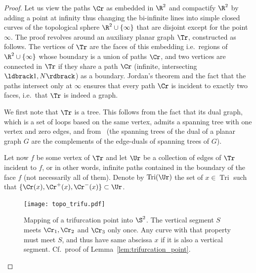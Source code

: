 \documentclass[12pt]{amsart}
\DeclareMathOperator{\Tri}{Tri}
\theoremstyle{remark}
\newcommand{\Li}{\ldbrack} %
\newcommand{\Ri}{\rdbrack}
\begin{document}
\begin{proof}
Let us view the paths $\Cr$ as embedded in $\R^2$ and compactify $\R^2$ by adding a point at infinity thus changing the bi-infinite lines into simple closed curves of the topological sphere $\R^2\cup\{\infty\}$ that are disjoint except for the point $\infty$. The proof revolves around an auxiliary planar graph $\Tr$, constructed as follows. The vertices of $\Tr$ are the faces of this embedding i.e.\ regions of $\R^2\cup\{\infty\}$ whose boundary is a union of paths $\Cr$, and two vertices are connected in $\Tr$ if they share a path $\Cr$ (infinite, intersecting $\Li 1,N\Ri$) as a boundary. Jordan's theorem and the fact that the paths intersect only at $\infty$ ensures that every path $\Cr$ is incident to exactly two faces, i.e.\ that $\Tr$ is indeed a graph.

We first note that $\Tr$ is a tree. This follows from the fact that its dual graph, which is a set of loops based on the same vertex, admits a spanning tree with one vertex and zero edges, and from~\cite[Theorem XI.6]{tut84} (the spanning trees of the dual of a planar graph $G$ are the complements of the edge-duals of spanning trees of $G$).



Let now $f$ be some vertex of $\Tr$ and let $\Ur$ be a collection of edges of $\Tr$ incident to $f$, or in other words, infinite paths contained in the boundary of the face $f$ (not necessarily all of them). Denote by $\Tri(\Ur)$ the set of $x\in\Tri$ such that $\{\Cr(x), \Cr^+(x),\Cr^-(x)\}\subset\Ur$. 

\begin{figure}
\texttt{[image: topo\_trifu.pdf]}
\caption{Mapping of a trifurcation point into $\S^2$. The vertical segment $S$ meets $\Cr_1,\Cr_2$ and $\Cr_3$ only once. Any curve with that property must meet $S$, and thus have same abscissa $x$ if it is also a vertical segment. Cf.~proof of Lemma~\ref{lem:trifurcation_point}.}
\label{fig:topo_trif}
\end{figure}


\end{proof}
\end{document}
